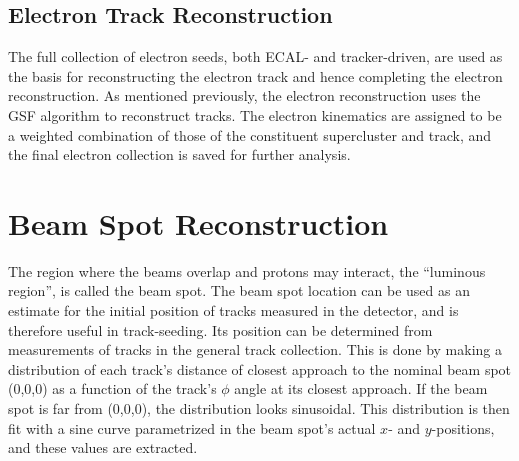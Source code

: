 \subsection{Electron Track Reconstruction}
\label{evReco:elecTrk}

The full collection of electron seeds, 
both ECAL- and tracker-driven, 
are used as the basis for reconstructing 
the electron track and hence 
completing the electron reconstruction.  
As mentioned previously, 
the electron reconstruction uses the 
GSF algorithm to reconstruct tracks.  
The electron kinematics are 
assigned to be a weighted combination 
of those of the constituent supercluster 
and track, 
and the final electron collection 
is saved for further analysis.  




\section{Beam Spot Reconstruction}
\label{evReco:BS}
The region where the beams overlap and protons may interact, 
the ``luminous region'', is called the beam spot.  
The beam spot location can be used as an estimate 
for the initial position of tracks measured in the detector, 
and is therefore useful in track-seeding.  
Its position %
can be determined from measurements of tracks in the 
general track collection.  
This is done by making a distribution of each track's distance of 
closest approach to the nominal beam spot (0,0,0) 
as a function of the track's $\phi$ angle at its 
closest approach.  
If the beam spot is far from (0,0,0), 
the distribution looks sinusoidal.  
This distribution is then fit with a sine curve 
parametrized in the beam spot's actual 
$x$- and $y$-positions, 
and these values are extracted.  

